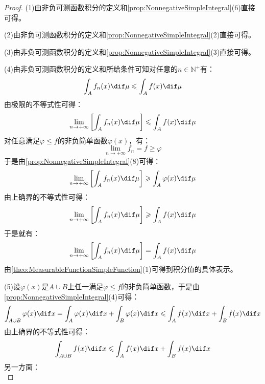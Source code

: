 \begin{proof}
	(1)由非负可测函数积分的定义和\cref{prop:NonnegativeSimpleIntegral}(6)直接可得。\par
	(2)由非负可测函数积分的定义和\cref{prop:NonnegativeSimpleIntegral}(2)直接可得。\par
	(3)由非负可测函数积分的定义和\cref{prop:NonnegativeSimpleIntegral}(3)直接可得。\par
	(4)由非负可测函数积分的定义和所给条件可知对任意的$n\in\mathbb{N}^+$有：
	\begin{equation*}
		\int_{A}^{}f_n(x)\dif\mu\leqslant\int_{A}^{}f(x)\dif\mu
	\end{equation*}
	由极限的不等式性可得：
	\begin{equation*}
		\lim_{n\to+\infty}\left[\int_{A}^{}f_n(x)\dif\mu\right]\leqslant\int_{A}^{}f(x)\dif\mu
	\end{equation*}
	对任意满足$\varphi\leqslant f$的非负简单函数$\varphi(x)$，有：
	\begin{equation*}
		\lim_{n\to+\infty}f_n=f\geqslant\varphi
	\end{equation*}
	于是由\cref{prop:NonnegativeSimpleIntegral}(8)可得：
	\begin{equation*}
		\lim_{n\to+\infty}\left[\int_{A}^{}f_n(x)\dif\mu\right]\geqslant\int_{A}^{}\varphi(x)\dif\mu
	\end{equation*}
	由上确界的不等式性可得：
	\begin{equation*}
		\lim_{n\to+\infty}\left[\int_{A}^{}f_n(x)\dif\mu\right]\geqslant\int_{A}^{}f(x)\dif\mu
	\end{equation*}
	于是就有：
	\begin{equation*}
		\lim_{n\to+\infty}\left[\int_{A}^{}f_n(x)\dif\mu\right]=\int_{A}^{}f(x)\dif\mu
	\end{equation*}
	由\cref{theo:MeasurableFunctionSimpleFunction}(1)可得到积分值的具体表示。\par
	(5)设$\varphi(x)$是$A\cup B$上任一满足$\varphi\leqslant f$的非负简单函数，于是由\cref{prop:NonnegativeSimpleIntegral}(4)可得：
	\begin{equation*}
		\int_{A\cup B}\varphi(x)\dif x=\int_{A}\varphi(x)\dif x+\int_{B}\varphi(x)\dif x\leqslant\int_{A}f(x)\dif x+\int_{B}f(x)\dif x
	\end{equation*}
	由上确界的不等式性可得：
	\begin{equation*}
		\int_{A\cup B}f(x)\dif x\leqslant\int_{A}f(x)\dif x+\int_{B}f(x)\dif x
	\end{equation*}
	另一方面：
	\begin{equation*}

\end{equation*}
\end{proof}

